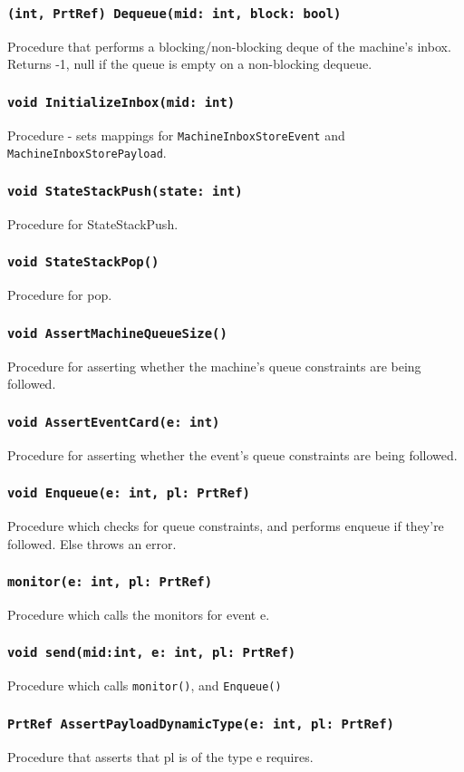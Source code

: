 \documentclass{llncs}
\begin{document}
\subsubsection{\texttt{(int, PrtRef) Dequeue(mid: int, block: bool)}} 
Procedure that performs a blocking/non-blocking deque of the machine's inbox. Returns -1, null if the queue is empty on a non-blocking dequeue.
\subsubsection{\texttt{void InitializeInbox(mid: int)} }
Procedure - sets mappings for \texttt{MachineInboxStoreEvent} and \texttt{MachineInboxStorePayload}.
\subsubsection{\texttt{void StateStackPush(state: int)} }
Procedure for StateStackPush.
\subsubsection{\texttt{void StateStackPop()} }
Procedure for pop.
\subsubsection{\texttt{void AssertMachineQueueSize()} }
Procedure for asserting whether the machine's queue constraints are being followed.
\subsubsection{\texttt{void AssertEventCard(e: int)} }
Procedure for asserting whether the event's queue constraints are being followed.
\subsubsection{\texttt{void Enqueue(e: int, pl: PrtRef)} }
Procedure which checks for queue constraints, and performs enqueue if they're followed. Else throws an error.
\subsubsection{\texttt{monitor(e: int, pl: PrtRef)} }
Procedure which calls the monitors for event e.
\subsubsection{\texttt{void send(mid:int, e: int, pl: PrtRef)} }
Procedure which calls \texttt{monitor()}, and \texttt{Enqueue()}
\subsubsection{\texttt{PrtRef AssertPayloadDynamicType(e: int, pl: PrtRef)} }
Procedure that asserts that pl is of the type e requires.
\end{document}
